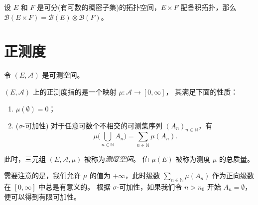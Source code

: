 \documentclass[fontset=none]{Notes}
\begin{document}
\begin{lemma}
  设 $E$ 和 $F$ 是可分(有可数的稠密子集)的拓扑空间，$E\times F$ 配备积拓扑，那么
  $\mathcal{B}(E\times F)=\mathcal{B}(E)\otimes \mathcal{B}(F)$。
\end{lemma}


\section{正测度}

令 $(E,\mathcal{A})$ 是可测空间。

\begin{definition}
  $(E,\mathcal{A})$ 上的正测度指的是一个映射 $\mu:\mathcal{A}\to [0,\infty]$，
  其满足下面的性质：
  \begin{enumerate}
    \item $\mu(\emptyset)=0$；
    \item ($\sigma$-可加性) 对于任意可数个不相交的可测集序列 $(A_n)_{n\in \mathbb{N}}$，有
    \[
      \mu\biggl(\bigcup_{n\in \mathbb{N}}A_n\biggr) =\sum_{n\in \mathbb{N}}\mu(A_n).
    \]
  \end{enumerate}
  此时，三元组 $(E,\mathcal{A},\mu)$ 被称为\emph{测度空间}。
  值 $\mu(E)$ 被称为测度 $\mu$ 的总质量。
\end{definition}

需要注意的是，我们允许 $\mu$ 的值为 $+\infty$，此时级数
$\sum_{n\in \mathbb{N}}\mu(A_n)$ 作为正向级数在 $[0,\infty]$
中总是有意义的。
根据 $\sigma$-可加性，如果我们令 $n>n_0$ 开始 $A_n=\emptyset$，
便可以得到有限可加性。
\end{document}
